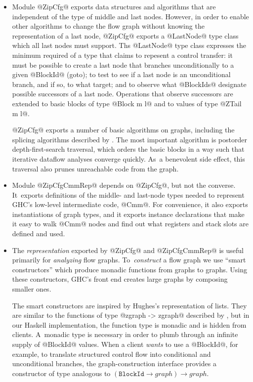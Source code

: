 \documentclass[blockstyle,preprint,nocopyrightspace]{sigplanconf}
\newcommand\arrow{\rightarrow}
\let\cite\citep
\begin{document}
\begin{itemize}
\item
Module @ZipCfg@ exports data structures and algorithms that are
independent of the type of middle and last nodes.
However, in order to enable other algorithms to change the flow graph
without knowing the representation of a last node, @ZipCfg@ exports a
@LastNode@ type class which all last nodes must support.
Ths @LastNode@ type class expresses the minimum required of a type
that claims to repesent a control transfer:
it must be possible to
create a last node that branches unconditionally to a given @BlockId@ (goto);
to test to see if a last node is an unconditional branch, and if so, to
what target;
and to observe what @BlockIds@ designate possible successors of a last
node.
Operations that observe successors are extended to basic
blocks of type @Block m l@ and to values of type @ZTail m l@.

@ZipCfg@ exports a number of basic algorithms on graphs, including the
splicing algorithms described by
\citet{ramsey-dias:applicative-flow-graph}. 
The most important algorithm is postorder depth-first-search
traversal, which orders the basic blocks in a way such that iterative
dataflow analyses converge quickly.
As~a benevolent side effect, this traversal also prunes unreachable
code from the graph.
\item
Module @ZipCfgCmmRep@ depends on @ZipCfg@, but not the converse.
It~exports definitions of the middle- and last-node types needed to
represent GHC's low-level intermediate code, @Cmm@.
For convenience, it also exports instantiations of graph types,
and it exports instance declarations that make it easy to walk @Cmm@
nodes and find out what registers and stack slots are defined and
used.
\item
The \emph{representation} exported by
@ZipCfg@ and @ZipCfgCmmRep@ is useful primarily
for \emph{analyzing} flow graphs.
To~\emph{construct} a flow graph we use ``smart constructors'' which
produce monadic functions from graphs to graphs.
Using these constructors, GHC's front end creates large graphs by
composing smaller ones.

The smart constructors are inspired by Hughes's \citeyearpar{hughes:novel-lists}
representation of lists.
They are similar to the functions of type 
@zgraph -> zgraph@ described by
\citet{ramsey-dias:applicative-flow-graph}, 
but in our Haskell implementation, the function type is monadic and is
hidden from clients.
A~monadic type is necessary in order to plumb through an infinite supply
of @BlockId@ values.
When a client \emph{wants} to use a @BlockId@, for example, to translate
structured control flow into conditional and unconditional branches,
the graph-construction interface provides a constructor of type
analogous to $(\mathtt{BlockId} \arrow \mathit{graph}) \arrow \mathit{graph}$.
\end{itemize}
\fi
\end{document}
